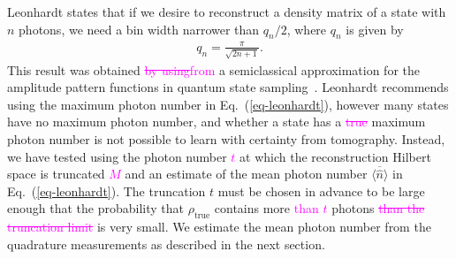 \documentclass[
reprint,
superscriptaddress,
showpacs,
amsmath,
amssymb,
aps,
pra,
longbibliography
]{revtex4-1}
\providecommand{\aucmnt}[1]{#1}
\providecommand{\editcolor}[2]{\textcolor{#1}{#2}}
\providecommand{\aucmnt}[1]{}
\providecommand{\editcolor}[2]{#2}
\newcommand{\SG}[1]{\editcolor{magenta}{#1}}
\newcommand{\SGs}[1]{\aucmnt{\editcolor{magenta}{\sout{#1}}}}
\newcommand{\rhotrue}{\rho_{\text{true}}}
\begin{document}
Leonhardt states that if we desire to reconstruct a density matrix of
a state with $n$ photons, we need a bin width narrower than $q_n/2$,
where $q_n$ is given by
\begin{eqnarray}
  q_n = \frac{\pi}{\sqrt{2 n + 1}}.
  \label{eq-leonhardt}
\end{eqnarray}
This result was obtained \SGs{by using}\SG{from} a semiclassical
approximation for the amplitude pattern functions in quantum state
sampling~\cite{Leonhardt1996}. Leonhardt recommends using the maximum
photon number in Eq.~(\ref{eq-leonhardt}), however many states have no
maximum photon number, and whether a state has a \SGs{true }maximum
photon number is not possible to learn with certainty from tomography.
Instead, we have tested using the photon number \SG{$t$} at which the
reconstruction Hilbert space is truncated\SGs{ $M$} and an estimate of
the mean photon number $\overline{\langle \hat{n} \rangle}$ in
Eq.~(\ref{eq-leonhardt}).  The truncation $t$ must be chosen in
advance to be large enough that the probability that $\rhotrue$
contains more \SG{than $t$} photons \SGs{than the truncation limit} is
very small.  We estimate the mean photon number from the quadrature
measurements as described in the next section.
\end{document}
